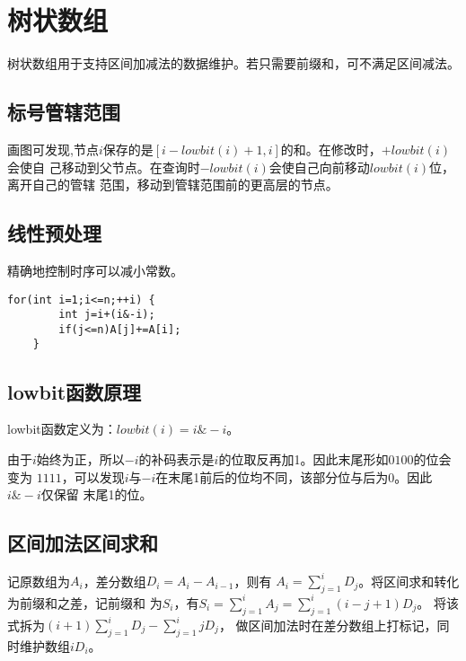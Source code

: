 \section{树状数组}
树状数组用于支持区间加减法的数据维护。若只需要前缀和，可不满足区间减法。
\subsection{标号管辖范围}

画图可发现,节点$i$保存的是$[i-lowbit(i)+1,i]$的和。在修改时，$+lowbit(i)$会使自
己移动到父节点。在查询时$-lowbit(i)$会使自己向前移动$lowbit(i)$位，离开自己的管辖
范围，移动到管辖范围前的更高层的节点。

\subsection{线性预处理}
精确地控制时序可以减小常数。

\begin{lstlisting}[title=LinearBuild]
    for(int i=1;i<=n;++i) {
        int j=i+(i&-i);
        if(j<=n)A[j]+=A[i];
    }
\end{lstlisting}

\subsection{lowbit函数原理}

lowbit函数定义为：$lowbit(i)=i\&-i$。

由于$i$始终为正，所以$-i$的补码表示是$i$的位取反再加1。因此末尾形如$0100$的位会变为
$1111$，可以发现$i$与$-i$在末尾1前后的位均不同，该部分位与后为0。因此$i\&-i$仅保留
末尾1的位。
\subsection{区间加法区间求和}
记原数组为$A_i$，差分数组$D_i=A_i-A_{i-1}$，则有
$\displaystyle A_i=\sum_{j=1}^i{D_j}$。将区间求和转化为前缀和之差，记前缀和
为$S_i$，有$\displaystyle S_i=\sum_{j=1}^i{A_j}=\sum_{j=1}^i{(i-j+1)D_j}$。
将该式拆为$\displaystyle (i+1)\sum_{j=1}^i{D_j}-\sum_{j=1}^i{jD_j}$，
做区间加法时在差分数组上打标记，同时维护数组$iD_i$。

